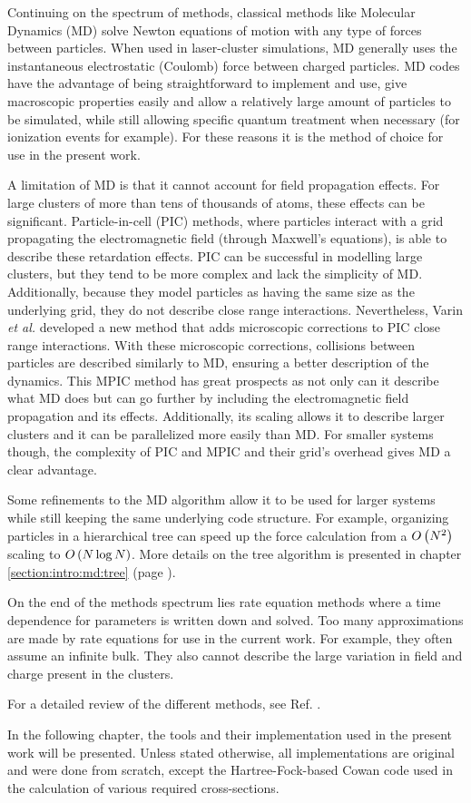 Continuing on the spectrum of methods, classical methods like Molecular
Dynamics (MD) solve Newton
equations of motion with any type of forces between particles\cite{Skeel1998}.
When used in
laser-cluster simulations, MD generally uses the instantaneous electrostatic
(Coulomb) force between charged particles. MD codes have the advantage of being
straightforward to implement and use, give macroscopic properties easily and allow a
relatively large amount of particles to be simulated, while still allowing
specific quantum treatment when necessary (for ionization events for example). For
these reasons it is the method of choice for use in the present work.

A limitation of MD is that it cannot account for field propagation effects. For
large clusters of more than tens of thousands of atoms, these effects can be
significant. Particle-in-cell (PIC) methods, where particles interact with a grid propagating the
electromagnetic field (through Maxwell's equations),
is able to describe these retardation effects. PIC can be successful in
modelling large clusters, but they tend to be more complex and lack the
simplicity of MD. Additionally, because they model particles as having the same
size as the underlying grid, they do not describe close range interactions.
Nevertheless, Varin \textit{et al.} developed a new method that adds microscopic
corrections to PIC close range interactions\cite{Varin2012}. With these microscopic
corrections, collisions between particles are described similarly to MD, ensuring
a better description of the dynamics. This MPIC method has great prospects
as not only can it describe what MD does but can go further by including the
electromagnetic field propagation and its effects. Additionally, its scaling
allows it to describe larger clusters and it can be parallelized more easily
than MD. For smaller systems though, the complexity of PIC and MPIC and their
grid's overhead gives MD a clear advantage.

Some refinements to the MD algorithm allow it to be used for larger systems
while still keeping the same underlying code structure. For example, organizing
particles in a hierarchical tree\cite{Barnes1986,Gibbon2002} can speed up the force
calculation from a $O\left( N^2 \right)$ scaling to $O\left( N \log{N} \right)$. More details on the
tree algorithm is presented in chapter \ref{section:intro:md:tree} (page
\pageref{section:intro:md:tree}).

On the end of the methods spectrum lies rate equation methods where a time
dependence for parameters is written down and solved. Too many approximations
are made by rate equations for use in the current work. For example, they often
assume an infinite bulk. They also cannot describe the large variation in field
and charge present in the clusters.

For a detailed review of the different methods, see Ref. \cite{Fennel2010}.

In the following chapter, the tools and their implementation used in the present
work will be presented. Unless stated otherwise, all implementations are original
and were done from scratch, except the Hartree-Fock-based Cowan code\cite{CowanCode} used
in the calculation of various required cross-sections.


